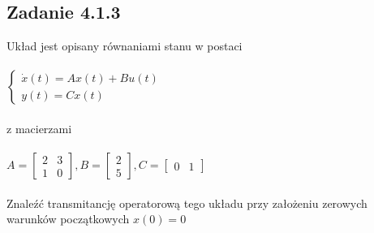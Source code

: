\pagebreak
\subsection*{Zadanie 4.1.3} {\color{darkgray}
	Układ jest opisany równaniami stanu w postaci\\\\
	$\begin{cases} \dot{x}(t)=Ax(t)+Bu(t)\\y(t)=Cx(t)\end{cases}$\\\\
	z macierzami\\\\
	$A=\left[\begin{array}{cc}2&3\\1&0\end{array}\right],
	B=\left[\begin{array}{c}2\\5\end{array}\right],
	C=\left[\begin{array}{cc}0&1\end{array}\right]$\\\\
	Znaleźć transmitancję operatorową tego układu przy założeniu zerowych warunków początkowych $x(0)=0$\\
}\lineh
\\\\


\pagebreak
